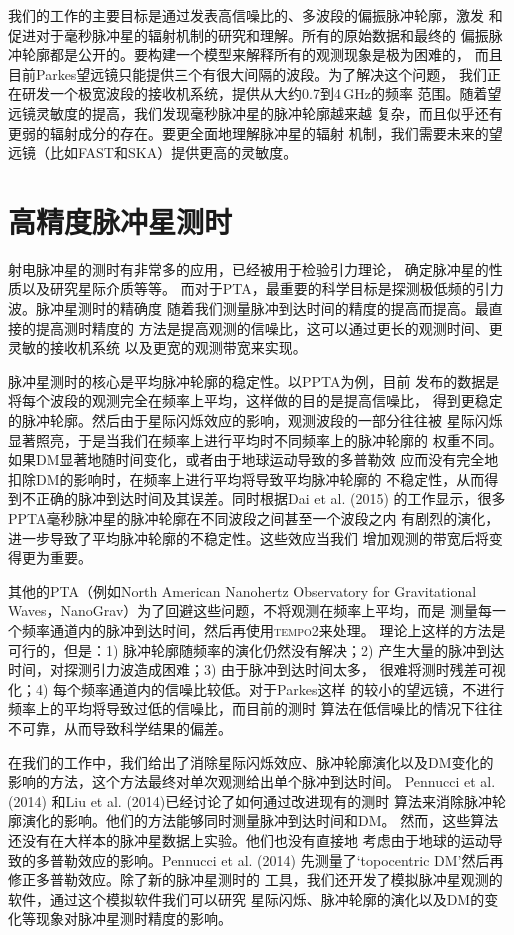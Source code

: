我们的工作的主要目标是通过发表高信噪比的、多波段的偏振脉冲轮廓，激发
和促进对于毫秒脉冲星的辐射机制的研究和理解。所有的原始数据和最终的
偏振脉冲轮廓都是公开的。要构建一个模型来解释所有的观测现象是极为困难的，
而且目前Parkes望远镜只能提供三个有很大间隔的波段。为了解决这个问题，
我们正在研发一个极宽波段的接收机系统，提供从大约0.7到4\,GHz的频率
范围。随着望远镜灵敏度的提高，我们发现毫秒脉冲星的脉冲轮廓越来越
复杂，而且似乎还有更弱的辐射成分的存在。要更全面地理解脉冲星的辐射
机制，我们需要未来的望远镜（比如FAST和SKA）提供更高的灵敏度。

\section{高精度脉冲星测时}

射电脉冲星的测时有非常多的应用，已经被用于检验引力理论\supercite{Kramer06}，
确定脉冲星的性质\supercite{Antoniadis}以及研究星际介质\supercite{Keith13}等等。
而对于PTA，最重要的科学目标是探测极低频的引力波。脉冲星测时的精确度
随着我们测量脉冲到达时间的精度的提高而提高。最直接的提高测时精度的
方法是提高观测的信噪比，这可以通过更长的观测时间、更灵敏的接收机系统
以及更宽的观测带宽来实现。

脉冲星测时的核心是平均脉冲轮廓的稳定性。以PPTA为例，目前
发布的数据是将每个波段的观测完全在频率上平均，这样做的目的是提高信噪比，
得到更稳定的脉冲轮廓。然后由于星际闪烁效应的影响，观测波段的一部分往往被
星际闪烁显著照亮，于是当我们在频率上进行平均时不同频率上的脉冲轮廓的
权重不同。如果DM显著地随时间变化，或者由于地球运动导致的多普勒效
应而没有完全地扣除DM的影响时，在频率上进行平均将导致平均脉冲轮廓的
不稳定性，从而得到不正确的脉冲到达时间及其误差。同时根据Dai et al. (2015)\supercite{dhm+15}
的工作显示，很多PPTA毫秒脉冲星的脉冲轮廓在不同波段之间甚至一个波段之内
有剧烈的演化，进一步导致了平均脉冲轮廓的不稳定性。这些效应当我们
增加观测的带宽后将变得更为重要。

其他的PTA（例如North American Nanohertz Observatory for Gravitational 
Waves，NanoGrav）为了回避这些问题，不将观测在频率上平均，而是
测量每一个频率通道内的脉冲到达时间，然后再使用\textsc{tempo2}来处理。
理论上这样的方法是可行的，但是：1) 脉冲轮廓随频率的演化仍然没有解决；2) 
产生大量的脉冲到达时间，对探测引力波造成困难；3) 由于脉冲到达时间太多，
很难将测时残差可视化；4) 每个频率通道内的信噪比较低。对于Parkes这样
的较小的望远镜，不进行频率上的平均将导致过低的信噪比，而目前的测时
算法在低信噪比的情况下往往不可靠，从而导致科学结果的偏差。

在我们的工作中，我们给出了消除星际闪烁效应、脉冲轮廓演化以及DM变化的
影响的方法，这个方法最终对单次观测给出单个脉冲到达时间。
Pennucci et al. (2014)\supercite{Pennucci14}
和Liu et al. (2014)\supercite{Liu14}已经讨论了如何通过改进现有的测时
算法来消除脉冲轮廓演化的影响。他们的方法能够同时测量脉冲到达时间和DM。
然而，这些算法还没有在大样本的脉冲星数据上实验。他们也没有直接地
考虑由于地球的运动导致的多普勒效应的影响。Pennucci et al. (2014)
先测量了`topocentric DM'然后再修正多普勒效应。除了新的脉冲星测时的
工具，我们还开发了模拟脉冲星观测的软件，通过这个模拟软件我们可以研究
星际闪烁、脉冲轮廓的演化以及DM的变化等现象对脉冲星测时精度的影响。


